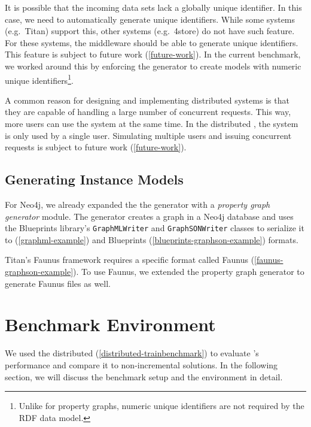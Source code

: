 It is possible that the incoming data sets lack a globally unique identifier. In this case, we need to automatically generate unique identifiers. While some systems (e.g.\ Titan) support this, other systems (e.g.\ 4store) do not have such feature. For these systems, the \iqd{} middleware should be able to generate unique identifiers. This feature is subject to future work (\autoref{future-work}). In the current benchmark, we worked around this by enforcing the generator to create models with numeric unique identifiers\footnote{Unlike for property graphs, numeric unique identifiers are not required by the RDF data model.}.

A common reason for designing and implementing distributed systems is that they are capable of handling a large number of concurrent requests. This way, more users can use the system at the same time. In the distributed \tb{}, the system is only used by a single user. Simulating multiple users and issuing concurrent requests is subject to future work (\autoref{future-work}).

\subsection{Generating Instance Models}

For Neo4j, we already expanded the the generator with a \emph{property graph generator} module. The generator creates a graph in a Neo4j database and uses the Blueprints library's \texttt{GraphMLWriter} and \texttt{GraphSONWriter} classes to serialize it to \graphml{} (\autoref{graphml-example}) and Blueprints \graphson{} (\autoref{blueprints-graphson-example}) formats. 

Titan's Faunus framework requires a specific format called Faunus \graphson{} (\autoref{faunus-graphson-example}). To use Faunus, we extended the property graph generator to generate Faunus \graphson{} files as well.


\section{Benchmark Environment}
\label{sec:benchmark-environment}

We used the distributed \tb{} (\autoref{distributed-trainbenchmark}) to evaluate \iqd{}'s performance and compare it to non-incremental solutions. In the following section, we will discuss the benchmark setup and the environment in detail. 

